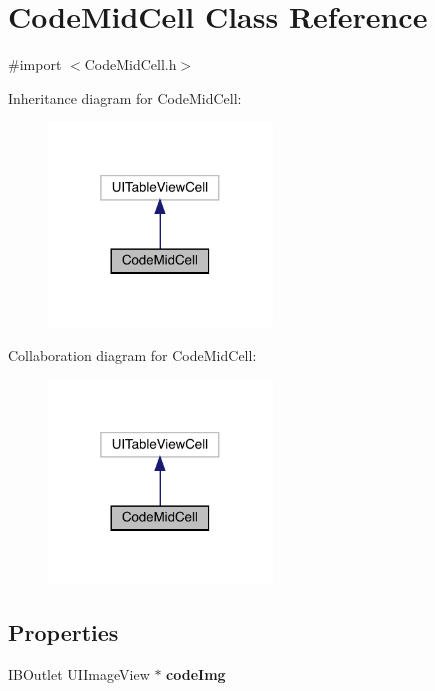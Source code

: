 \hypertarget{interface_code_mid_cell}{}\section{Code\+Mid\+Cell Class Reference}
\label{interface_code_mid_cell}


{\ttfamily \#import $<$Code\+Mid\+Cell.\+h$>$}



Inheritance diagram for Code\+Mid\+Cell\+:\nopagebreak
\begin{figure}[H]
\begin{center}
\leavevmode
\includegraphics[width=169pt]{interface_code_mid_cell__inherit__graph}
\end{center}
\end{figure}


Collaboration diagram for Code\+Mid\+Cell\+:\nopagebreak
\begin{figure}[H]
\begin{center}
\leavevmode
\includegraphics[width=169pt]{interface_code_mid_cell__coll__graph}
\end{center}
\end{figure}
\subsection*{Properties}
\begin{DoxyCompactItemize}
\item 
\mbox{\label{interface_code_mid_cell_a09e52115c4f126597349219d005a81c6}} 
I\+B\+Outlet U\+I\+Image\+View $\ast$ {\bfseries code\+Img}
\end{DoxyCompactItemize}


